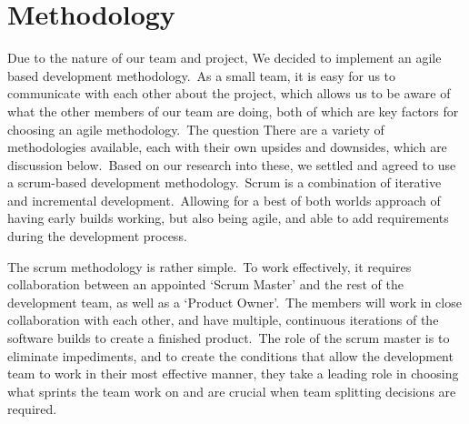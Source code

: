 \chapter{Methodology} \label{ch:methodology}

    Due to the nature of our team and project, We decided to implement an agile based development methodology.\ As a
    small team, it is easy for us to communicate with each other about the project, which allows us to be aware of what
    the other members of our team are doing, both of which are key factors for choosing an agile methodology.\ The
    question There are a variety of methodologies available, each with their own upsides and downsides, which are
    discussion below.\ Based on our research into these, we settled and agreed to use a scrum-based development
    methodology.\ Scrum is a combination of iterative and incremental development.\ Allowing for a best of both worlds
    approach of having early builds working, but also being agile, and able to add requirements during the development
    process\cite{srivastava_2017_scrum}.

    The scrum methodology is rather simple.\ To work effectively, it requires collaboration between an appointed ‘Scrum
    Master’ and the rest of the development team, as well as a ‘Product Owner’.\ The members will work in close
    collaboration with each other, and have multiple, continuous iterations of the software builds to create a finished
    product.\ The role of the scrum master is to eliminate impediments\cite{srivastava_2017_scrum}, and to create the
    conditions that allow the development team to work in their most effective manner, they take a leading role in
    choosing what sprints the team work on and are crucial when team splitting decisions are required.

